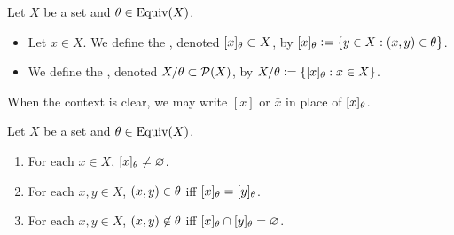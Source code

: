 \documentclass{book}
\begin{document}
	
	\begin{defn}
		Let $X$ be a set and $\theta \in \operatorname*{\text{Equiv}}(X)$.
		\begin{itemize}
			\item Let $x \in X$. We define the , denoted $[x]_{\theta} \subset X$, by $[x]_{\theta} \vcentcolon= \{y \in X: (x,y) \in \theta\}$.  
			\item We define the , denoted $X/\theta \subset \mathcal{P}(X)$, by $X/\theta \vcentcolon= \{[x]_{\theta}: x \in X\}$. 
		\end{itemize}
	\end{defn}
	
	\begin{note}
		When the context is clear, we may write $[x]$ or $\bar{x}$ in place of $[x]_{\theta}$.
	\end{note}
	
	\begin{ex}
		Let $X$ be a set and $\theta \in \operatorname*{\text{Equiv}}(X)$. 
		\begin{enumerate}
			\item For each $x \in X$, $[x]_{\theta} \neq \varnothing$.
			\item For each $x,y \in X$, $(x,y) \in \theta$ iff $[x]_{\theta} = [y]_{\theta}$.
			\item For each $x,y \in X$, $(x,y) \not \in \theta$ iff $[x]_{\theta} \cap [y]_{\theta} = \varnothing$.
		\end{enumerate}
	\end{ex}
	
\end{document}
